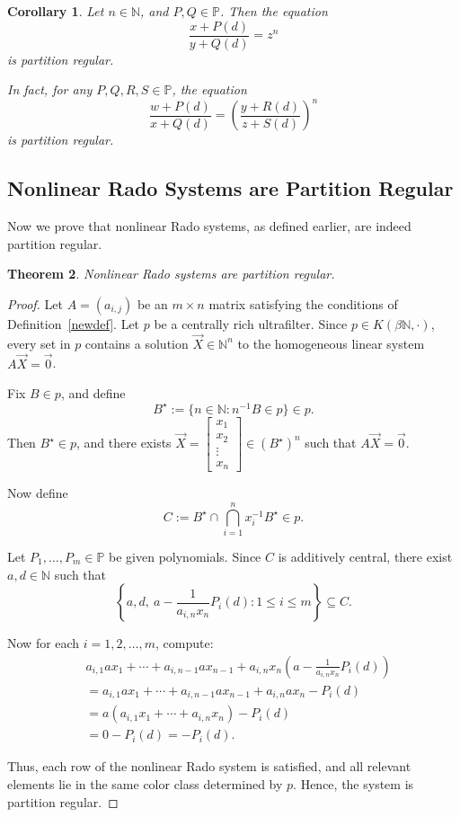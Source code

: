 \documentclass{article}
\theoremstyle{Theorem}
\newtheorem{thm}{Theorem}[section]
\newtheorem{cor}[thm]{Corollary}
\theoremstyle{definition}
\begin{document}
\begin{cor}

Let \( n \in \mathbb{N} \), and \( P, Q \in \mathbb{P} \). Then the equation 
\[
\frac{x + P(d)}{y + Q(d)} = z^n
\]
is partition regular.

In fact, for any \( P, Q, R, S \in \mathbb{P} \), the equation
\[
\frac{w + P(d)}{x + Q(d)} = \left( \frac{y + R(d)}{z + S(d)} \right)^n
\]
is partition regular.
\end{cor}


\subsection{Nonlinear Rado Systems are Partition Regular}

Now we prove that nonlinear Rado systems, as defined earlier, are indeed partition regular.

\begin{thm}\label{ho}
    Nonlinear Rado systems are partition regular.
\end{thm}

\begin{proof}
Let \( A = (a_{i,j}) \) be an \( m \times n \) matrix satisfying the conditions of Definition~\ref{newdef}.  
Let \( p \) be a centrally rich ultrafilter. Since \( p \in K(\beta \mathbb{N}, \cdot) \), every set in \( p \) contains a solution \( \vec{X} \in \mathbb{N}^n \) to the homogeneous linear system \( A\vec{X} = \vec{0} \).

Fix \( B \in p \), and define
\[
B^\star := \{ n \in \mathbb{N} : n^{-1}B \in p \} \in p.
\]
Then \( B^\star \in p \), and there exists \( \vec{X} = \begin{bmatrix} x_1 \\ x_2 \\ \vdots \\ x_n \end{bmatrix} \in (B^\star)^n \) such that \( A\vec{X} = \vec{0} \).

Now define
\[
C := B^\star \cap \bigcap_{i=1}^n x_i^{-1} B^\star \in p.
\]

Let \( P_1, \ldots, P_m \in \mathbb{P} \) be given polynomials. Since \( C \) is additively central, there exist \( a, d \in \mathbb{N} \) such that
\[
\left\{ a, d,\ a - \frac{1}{a_{i,n} x_n} P_i(d) : 1 \leq i \leq m \right\} \subseteq C.
\]

Now for each \( i = 1, 2, \ldots, m \), compute:
\[
\begin{aligned}
& a_{i,1} a x_1 + \cdots + a_{i,n-1} a x_{n-1} + a_{i,n} x_n \left( a - \frac{1}{a_{i,n} x_n} P_i(d) \right) \\
&= a_{i,1} a x_1 + \cdots + a_{i,n-1} a x_{n-1} + a_{i,n} a x_n - P_i(d) \\
&= a \left( a_{i,1} x_1 + \cdots + a_{i,n} x_n \right) - P_i(d) \\
&= 0 - P_i(d) = -P_i(d).
\end{aligned}
\]

Thus, each row of the nonlinear Rado system is satisfied, and all relevant elements lie in the same color class determined by \( p \). Hence, the system is partition regular.
\end{proof}
\end{document}

